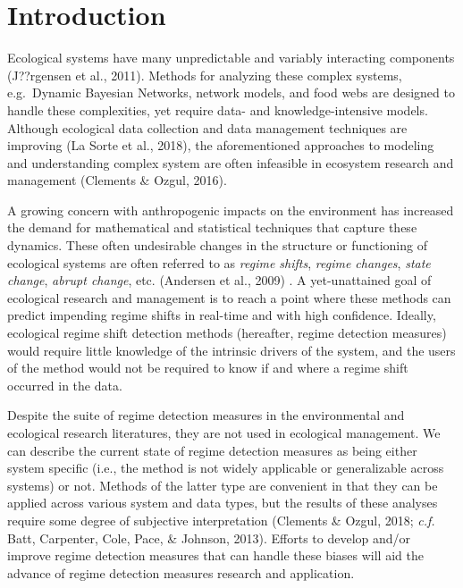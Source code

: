 \documentclass[12pt,twoside,openany]{reedthesis}
\begin{document}
\hypertarget{introduction-4}{%
\section{Introduction}\label{introduction-4}}

Ecological systems have many unpredictable and variably interacting components (J??rgensen et al., 2011). Methods for analyzing these complex systems, e.g.~Dynamic Bayesian Networks, network models, and food webs are designed to handle these complexities, yet require data- and knowledge-intensive models. Although ecological data collection and data management techniques are improving (La Sorte et al., 2018), the aforementioned approaches to modeling and understanding complex system are often infeasible in ecosystem research and management (Clements \& Ozgul, 2016).

A growing concern with anthropogenic impacts on the environment has increased the demand for mathematical and statistical techniques that capture these dynamics. These often undesirable changes in the structure or functioning of ecological systems are often referred to as \emph{regime shifts}, \emph{regime changes}, \emph{state change}, \emph{abrupt change}, etc. (Andersen et al., 2009) . A yet-unattained goal of ecological research and management is to reach a point where these methods can predict impending regime shifts in real-time and with high confidence. Ideally, ecological regime shift detection methods (hereafter, regime detection measures) would require little knowledge of the intrinsic drivers of the system, and the users of the method would not be required to know if and where a regime shift occurred in the data.

Despite the suite of regime detection measures in the environmental and ecological research literatures, they are not used in ecological management. We can describe the current state of regime detection measures as being either system specific (i.e., the method is not widely applicable or generalizable across systems) or not. Methods of the latter type are convenient in that they can be applied across various system and data types, but the results of these analyses require some degree of subjective interpretation (Clements \& Ozgul, 2018; \emph{c.f.} Batt, Carpenter, Cole, Pace, \& Johnson, 2013). Efforts to develop and/or improve regime detection measures that can handle these biases will aid the advance of regime detection measures research and application.
\end{document}
